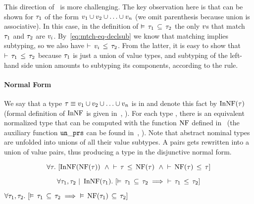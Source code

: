 This direction of~ is more challenging. 
The key observation here is that  can be shown for 
$\tau_1$ of the form $v_1 \cup v_2 \cup \ldots \cup v_n$
(we omit parenthesis because union is associative).
In this case, in the definition of $\vDash \, \tau_1 \, \subseteq \, \tau_2$ the only
$v$s that match $\tau_1$ and $\tau_2$ are $v_i$. 
By~\eqref{eq:mtch-eq-declsub} we know that matching implies subtyping,
so we also have $\vdash \, v_i \, \leq \, \tau_2$.
From the latter, it is easy to show that $\vdash \, \tau_1 \, \leq \, \tau_2$ because
$\tau_1$ is just a union of value types, 
and subtyping of the left-hand side union amounts to subtyping its components,
according to the  rule.

\paragraph{Normal Form}
We say that a type $\tau \equiv v_1 \cup v_2 \cup \ldots \cup v_n$
is in  and denote this fact by $\mathop{\mathrm{InNF}}(\tau)$ 
(formal definition of $\mathop{\mathrm{InNF}}$ is given 
in~, ).
For each type \ty, there is an equivalent normalized type 
that can be computed with the function $\mathop{\mathrm{NF}}$
defined in~ (the auxiliary function $\mathop{\mathtt{un\_prs}}$ 
can be found in~, ).
Note that abstract nominal types are unfolded into unions of all their
value subtypes. A pairs gets rewritten into a union of value pairs, 
thus producing a type in the disjunctive normal form.

\begin{lemma}\label{lem:declsub-nf}
\[
\forall \tau.\ [\mathop{\mathrm{InNF}}(\mathop{\mathrm{NF}}(\tau))\;\ \land\;
\vdash \, \tau \, \leq \, \mathop{\mathrm{NF}}(\tau)\;\ \land\; \vdash \, \mathop{\mathrm{NF}}(\tau) \, \leq \, \tau]
\]
\end{lemma}

\begin{lemma}
\label{lem:nf-declsub-complete}
\[
	\forall \ty_1, \ty_2 \Alt \InNF(\ty_1).\
	[\bjsemsub{\ty_1}{\ty_2} \implies\ \bjsub{\ty_1}{\ty_2}]
\]
\end{lemma}

\begin{lemma}\label{lem:nf-semsub}
$
\forall \ty_1, \ty_2.\ 
[\bjsemsub{\ty_1}{\ty_2} \implies\ \bjsemsub{\NF(\ty_1)}{\ty_2}]
$
\end{lemma}

